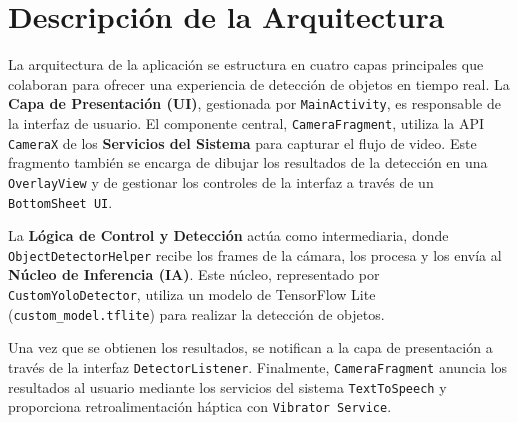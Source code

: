 \documentclass{article}
\begin{document}
\section*{Descripción de la Arquitectura}

La arquitectura de la aplicación se estructura en cuatro capas principales que colaboran para ofrecer una experiencia de detección de objetos en tiempo real. 
La \textbf{Capa de Presentación (UI)}, gestionada por \texttt{MainActivity}, es responsable de la interfaz de usuario. El componente central, \texttt{CameraFragment}, utiliza la API \texttt{CameraX} de los \textbf{Servicios del Sistema} para capturar el flujo de video. Este fragmento también se encarga de dibujar los resultados de la detección en una \texttt{OverlayView} y de gestionar los controles de la interfaz a través de un \texttt{BottomSheet UI}.

La \textbf{Lógica de Control y Detección} actúa como intermediaria, donde \texttt{ObjectDetectorHelper} recibe los frames de la cámara, los procesa y los envía al \textbf{Núcleo de Inferencia (IA)}. Este núcleo, representado por \texttt{CustomYoloDetector}, utiliza un modelo de TensorFlow Lite (\texttt{custom\_model.tflite}) para realizar la detección de objetos. 

Una vez que se obtienen los resultados, se notifican a la capa de presentación a través de la interfaz \texttt{DetectorListener}. Finalmente, \texttt{CameraFragment} anuncia los resultados al usuario mediante los servicios del sistema \texttt{TextToSpeech} y proporciona retroalimentación háptica con \texttt{Vibrator Service}.
\end{document}
